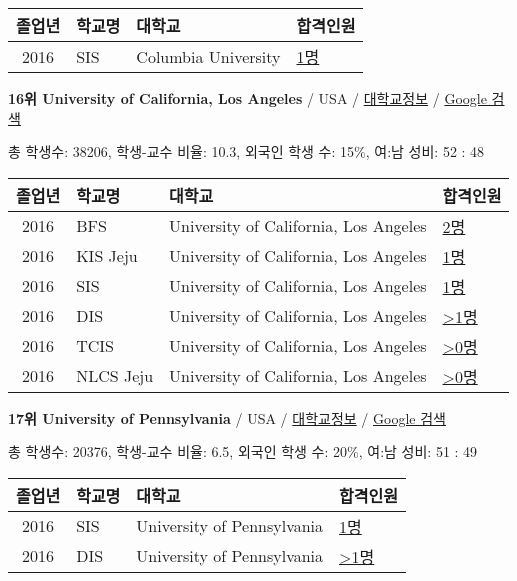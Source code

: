 \documentclass[13pt,]{article}
\begin{document}
\begin{longtable}[]{@{}clll@{}}
\toprule
졸업년 & 학교명 & 대학교 & 합격인원\tabularnewline
\midrule
\endhead
2016 & SIS & Columbia University &
\href{http://cafe.naver.com/assarabia/11589}{1명}\tabularnewline
\bottomrule
\end{longtable}

\textbf{16위 University of California, Los Angeles} / USA /
\href{https://www.timeshighereducation.com/world-university-rankings/university-of-california-los-angeles?ranking-dataset=133819}{대학교정보}
/
\href{http://www.google.com/search?q=University+of+California,+Los+Angeles}{Google
검색}

총 학생수: 38206, 학생-교수 비율: 10.3, 외국인 학생 수: 15\%, 여:남
성비: 52 : 48

\begin{longtable}[]{@{}clll@{}}
\toprule
졸업년 & 학교명 & 대학교 & 합격인원\tabularnewline
\midrule
\endhead
2016 & BFS & University of California, Los Angeles &
\href{http://cafe.naver.com/assarabia/11597}{2명}\tabularnewline
2016 & KIS Jeju & University of California, Los Angeles &
\href{http://cafe.naver.com/assarabia/11596}{1명}\tabularnewline
2016 & SIS & University of California, Los Angeles &
\href{http://cafe.naver.com/assarabia/11589}{1명}\tabularnewline
2016 & DIS & University of California, Los Angeles &
\href{http://cafe.naver.com/assarabia/11591}{\textgreater{}1명}\tabularnewline
2016 & TCIS & University of California, Los Angeles &
\href{http://cafe.naver.com/assarabia/11598}{\textgreater{}0명}\tabularnewline
2016 & NLCS Jeju & University of California, Los Angeles &
\href{http://cafe.naver.com/assarabia/11592}{\textgreater{}0명}\tabularnewline
\bottomrule
\end{longtable}

\textbf{17위 University of Pennsylvania} / USA /
\href{https://www.timeshighereducation.com/world-university-rankings/university-of-pennsylvania?ranking-dataset=133819}{대학교정보}
/
\href{http://www.google.com/search?q=University+of+Pennsylvania}{Google
검색}

총 학생수: 20376, 학생-교수 비율: 6.5, 외국인 학생 수: 20\%, 여:남 성비:
51 : 49

\begin{longtable}[]{@{}clll@{}}
\toprule
졸업년 & 학교명 & 대학교 & 합격인원\tabularnewline
\midrule
\endhead
2016 & SIS & University of Pennsylvania &
\href{http://cafe.naver.com/assarabia/11589}{1명}\tabularnewline
2016 & DIS & University of Pennsylvania &
\href{http://cafe.naver.com/assarabia/11591}{\textgreater{}1명}\tabularnewline
\bottomrule
\end{longtable}
\end{document}
